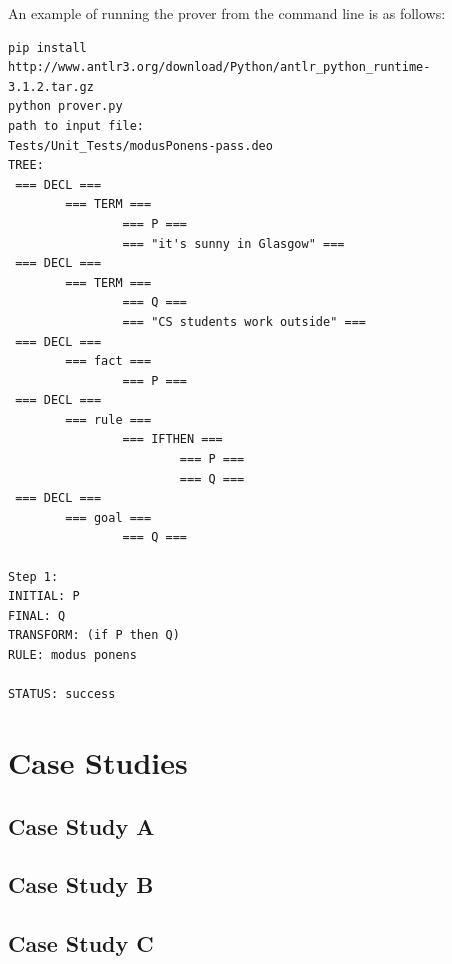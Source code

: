 \documentclass{l4proj}
\begin{document}
\begin{appendices}
An example of running the prover from the command line is as follows:
\begin{verbatim}
pip install http://www.antlr3.org/download/Python/antlr_python_runtime-3.1.2.tar.gz
python prover.py
path to input file:
Tests/Unit_Tests/modusPonens-pass.deo
TREE: 
 === DECL ===
        === TERM ===
                === P ===
                === "it's sunny in Glasgow" ===
 === DECL ===
        === TERM ===
                === Q ===
                === "CS students work outside" ===
 === DECL ===
        === fact ===
                === P ===
 === DECL ===
        === rule ===
                === IFTHEN ===
                        === P ===
                        === Q ===
 === DECL ===
        === goal ===
                === Q ===

Step 1: 
INITIAL: P
FINAL: Q
TRANSFORM: (if P then Q)
RULE: modus ponens

STATUS: success
\end{verbatim}

\chapter{Case Studies}
\section{Case Study A}
\label{casestudyA}

\section{Case Study B}
\label{casestudyB}

\section{Case Study C}
\label{casestudyC}


\end{appendices}




\end{document}
